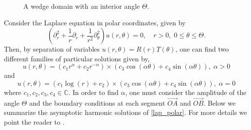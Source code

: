 \begin{figure}[H]
\centering
{}
\caption{A wedge domain with an interior angle \(\Theta\).}\label{wedge}
\end{figure}
Consider the Laplace equation in polar coordinates, given by
\begin{equation}\label{lap_polar}
    \left(\partial_r^2 + \frac{1}{r} \partial_r +\frac{1}{r^2}\partial_\theta^2\right)u(r,\theta) = 0, \quad r>0, \; 0 \leq \theta \leq \Theta.
\end{equation}
Then, by separation of variables \(u(r, \theta) = R(r) T(\theta)\), one can find two different families of particular solutions given by,
\[
    u(r,\theta) = \left(c_1 r^\alpha + c_2 r^{-\alpha}\right) \times \left(c_3 \cos(\alpha \theta) + c_4 \sin(\alpha \theta)\right), \; \alpha >0
\]
and
\[
    u(r,\theta) = \left(c_1 \log (r) + c_2 \right) \times \left(c_3 \cos(\alpha \theta) + c_4 \sin(\alpha \theta)\right), \; \alpha =0
\]
where \(c_1, c_2, c_3, c_4 \in \mathbb{C}\). In order to find \(\alpha\), one must consider the amplitude of the angle \(\Theta\) and the boundary conditions at each segment \(\overrightarrow{OA}\) and \(\overrightarrow{OB}\). Below we summarize the asymptotic harmonic solutions of \eqref{lap_polar}. For more details we point the reader to \cite{li2000singularities}.
